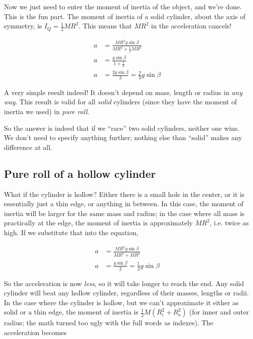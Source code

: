 \documentclass[8.01x]{subfiles}
\begin{document}
Now we just need to enter the moment of inertia of the object, and we're done. This is the fun part. The moment of inertia of a solid cylinder, about the axis of symmetry, is $I_Q = \frac{1}{2} M R^2$. This means that $M R^2$ in the acceleration cancels!

\begin{align}
a &= \frac{M R^2 g \sin \beta}{M R^2 + \frac{1}{2} M R^2}\\
a &= \frac{g \sin \beta}{1 + \frac{1}{2}}\\
a &= \frac{2 g \sin \beta}{3} = \frac{2}{3} g \sin \beta
\end{align}

A very simple result indeed! It doesn't depend on mass, length or radius in \emph{any way}. This result is valid for all \emph{solid} cylinders (since they have the moment of inertia we used) in \emph{pure roll}.

So the answer is indeed that if we ``race'' two solid cylinders, neither one wins. We don't need to specify anything further; nothing else than ``solid'' makes any difference at all.

\subsection{Pure roll of a hollow cylinder}

What if the cylinder is hollow? Either there is a small hole in the center, or it is essentially just a thin edge, or anything in between. In this case, the moment of inertia will be larger for the same mass and radius; in the case where all mass is practically at the edge, the moment of inertia is approximately $M R^2$, i.e. twice as high. If we substitute that into the equation,

\begin{align}
a &= \frac{M R^2 g \sin \beta}{M R^2 + M R^2}\\
a &= \frac{g \sin \beta}{2} = \frac{1}{2} g \sin \beta
\end{align}

So the acceleration is now \emph{less}, so it will take longer to reach the end. Any solid cylinder will beat any hollow cylinder, regardless of their masses, lengths or radii.\\
In the case where the cylinder is hollow, but we can't approximate it either as solid or a thin edge, the moment of inertia is $\frac{1}{2} M(R_i^2 + R_o^2)$ (for inner and outer radius; the math turned too ugly with the full words as indexes). The acceleration becomes
\end{document}
